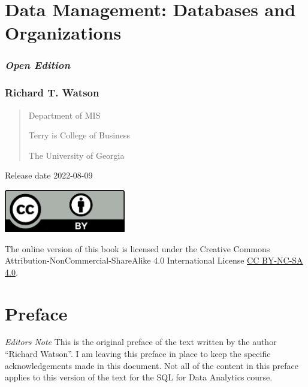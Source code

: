 \documentclass[
]{article}
\author{}
\date{\vspace{-2.5em}}
\begin{document}
\hypertarget{data-management-databases-and-organizations}{%
\section*{Data Management: Databases and
Organizations}\label{data-management-databases-and-organizations}}

\hypertarget{open-edition}{%
\subsubsection*{\texorpdfstring{\emph{Open
Edition}}{Open Edition}}\label{open-edition}}

\hypertarget{richard-t.-watson}{%
\subsubsection*{Richard T. Watson}\label{richard-t.-watson}}

\begin{quote}
Department of MIS

Terry is College of Business

The University of Georgia
\end{quote}

Release date 2022-08-09

\includegraphics[width=2.08333in,height=\textheight]{Figures/Front matter/CC.by.png}

The online version of this book is licensed under the Creative Commons
Attribution-NonCommercial-ShareAlike 4.0 International License
\href{https://creativecommons.org/licenses/by-nc-sa/4.0/}{CC BY-NC-SA
4.0}.

\newpage

\hypertarget{preface}{%
\section*{Preface}\label{preface}}

\emph{Editors Note} This is the original preface of the text written by
the author ``Richard Watson''. I am leaving this preface in place to
keep the specific acknowledgements made in this document. Not all of the
content in this preface applies to this version of the text for the SQL
for Data Analytics course.
\end{document}
